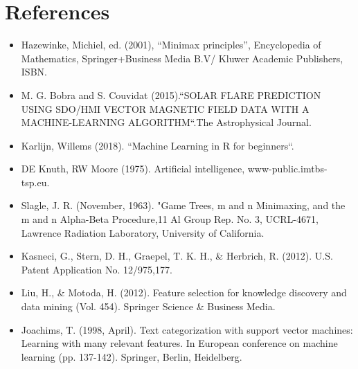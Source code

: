 \documentclass[master]{subfiles}
\begin{document}
\section{References}
\begin{itemize}[label=$\bullet$, itemsep=4pt]
\item Hazewinke, Michiel, ed. (2001), “Minimax principles”, Encyclopedia of Mathematics,
Springer+Business Media B.V/ Kluwer Academic Publishers, ISBN.
\item M. G. Bobra and S. Couvidat  (2015).“SOLAR FLARE PREDICTION USING SDO/HMI VECTOR MAGNETIC FIELD DATA WITH A MACHINE-LEARNING ALGORITHM“.The Astrophysical Journal.
\item Karlijn, Willems (2018). “Machine Learning in R for beginners“. 
\item DE Knuth, RW Moore (1975). Artificial intelligence, www-public.imtbs-tsp.eu.
\item Slagle, J. R. (November, 1963). "Game Trees, m and n Minimaxing, and the m and n Alpha-Beta Procedure,11 Al Group Rep. No. 3, UCRL-4671, Lawrence Radiation Laboratory, University of California.
\item Kasneci, G., Stern, D. H., Graepel, T. K. H., \& Herbrich, R. (2012). U.S. Patent Application No. 12/975,177.
\item Liu, H., \& Motoda, H. (2012). Feature selection for knowledge discovery and data mining (Vol. 454). Springer Science \& Business Media.
\item Joachims, T. (1998, April). Text categorization with support vector machines: Learning with many relevant features. In European conference on machine learning (pp. 137-142). Springer, Berlin, Heidelberg.
\end{itemize}
\newpage
\end{document}
